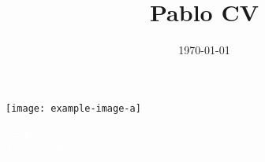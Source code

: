\documentclass[11pt, oneside, a4paper, titlepage]{article}
\title{Pablo CV}
\date{\today}
\begin{document}

\begin{tcolorbox}
\begin{minipage}{4.0cm}
\hspace*{-0.3cm}\texttt{[image: example-image-a]}
\end{minipage}
\begin{minipage}{15cm}
\begin{center}
\Huge{\textcolor{white}{Pablo}} \\
\vspace*{0.5cm}
\Large{\textcolor{white}{\emph{Electrical Engineer}}}
\end{center}
\end{minipage}
\end{tcolorbox}

\end{document}
